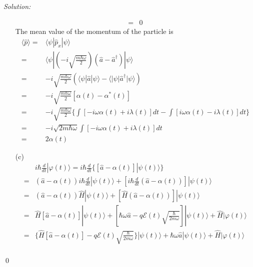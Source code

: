 \documentclass[12pt,a4paper]{article}
\newenvironment{sol}
    {\emph{Solution:}
    }
    {
    \qed
    }
\begin{document}
\begin{sol}
\begin{itemize}
\begin{align}
=&0
\end{align}
The mean value of the momentum of the particle is
\begin{align}
\nonumber\langle\hat{p}\rangle=&\langle\psi|\hat{p}_x|\psi\rangle\\
\nonumber=&\langle\psi|(-i\sqrt{\frac{m\hbar\omega}{2}})(\hat{a}-\hat{a}^{\dagger})|\psi\rangle\\
\nonumber=&-i\sqrt{\frac{m\hbar\omega}{2}}(\langle\psi|\hat{a}|\psi\rangle-\langle|\psi|\hat{a}^{\dagger}|\psi\rangle)\\
\nonumber=&-i\sqrt{\frac{m\hbar\omega}{2}}[\alpha(t)-\alpha^*(t)]\\
\nonumber=&-i\sqrt{\frac{m\hbar\omega}{2}}\{\int[-i\omega\alpha(t)+i\lambda(t)]dt-\int[i\omega\alpha(t)-i\lambda(t)]dt\}\\
\nonumber=&-i\sqrt{2m\hbar\omega}\int[-i\omega\alpha(t)+i\lambda(t)]dt\\
=&2\alpha(t)
\end{align}
\item[(c)]
\begin{align}
\nonumber&i\hbar\frac{d}{dt}|\varphi(t)\rangle=i\hbar\frac{d}{dt}\{[\hat{a}-\alpha(t)]|\psi(t)\rangle\}\\
\nonumber=&(\hat{a}-\alpha(t))i\hbar\frac{d}{dt}|\psi(t)\rangle+[i\hbar\frac{d}{dt}(\hat{a}-\alpha(t))]|\psi(t)\rangle\\
\nonumber=&(\hat{a}-\alpha(t))\hat{H}|\psi(t)\rangle+[\hat{H}(\hat{a}-\alpha(t))]|\psi(t)\rangle\\
\nonumber=&\hat{H}[\hat{a}-\alpha(t)]|\psi(t)\rangle+[\hbar\omega\hat{a}-q\mathcal{E}(t)\sqrt{\frac{\hbar}{2m\omega}}]|\psi(t)\rangle+\hat{H}|\varphi(t)\rangle\\
\nonumber=&\{\hat{H}[\hat{a}-\alpha(t)]-q\mathcal{E}(t)\sqrt{\frac{\hbar}{2m\omega}}\}|\psi(t)\rangle+\hbar\omega\hat{a}|\psi(t)\rangle+\hat{H}|\varphi(t)\rangle\\

\end{align}
\end{itemize}
\end{sol}
\end{document}
